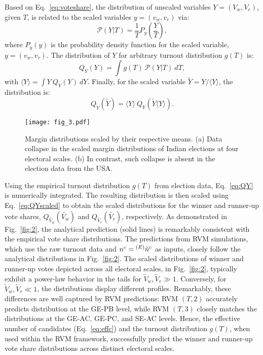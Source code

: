 Based on Eq.~\ref{eq:voteshare}, the distribution of unscaled variables $Y = (V_w, V_r)$, given $T$, is related to the scaled variables $y = (v_w, v_r)$ via:
\begin{equation}
    \mathcal{P}(Y|T) = \frac{1}{T}P_y\left(\frac{Y}{T}\right),
    \label{eq:PYT}
\end{equation}
where $P_y(y)$ is the probability density function for the scaled variable, $y = (v_w, v_r)$. The distribution of $Y$ for arbitrary turnout distribution $g(T)$ is:
\begin{equation}
    Q_Y(Y) = \int g(T)~\mathcal{P}(Y|T)~dT, 
    \label{eq:QY}
\end{equation}
with $\langle Y \rangle = \int Y ~  Q_Y(Y)~dY$.
Finally, for the scaled variable $\widetilde{Y} = Y / \langle Y \rangle$, the distribution is:
\begin{equation}
    Q_{\widetilde{Y}}(\widetilde{Y}) =  \langle Y \rangle ~ Q_Y(\widetilde{Y}  \langle Y \rangle). 
    \label{eq:QYscaled}
\end{equation}
\begin{figure}[h!]
    \centering
    \texttt{[image: fig\_3.pdf]}
    \caption{Margin distributions scaled by their respective means. (a) Data collapse in the scaled margin distributions of Indian elections at four electoral scales. (b) In contrast, such collapse is absent in the election data from the USA.}
    \label{fig:3}
\end{figure}
Using the empirical turnout distribution $g(T)$ from election data, Eq.~\ref{eq:QY} is numerically integrated. The resulting distribution is then scaled using Eq.~\ref{eq:QYscaled} to obtain the scaled distributions for the winner and runner-up vote shares, $ Q_{\widetilde{V_w}}(\widetilde{V_w})$ and $Q_{\widetilde{V_r}}(\widetilde{V_r})$, respectively. As demonstrated in Fig.~\ref{fig:2}, the analytical prediction (solid lines) is remarkably consistent with the empirical vote share distributions. The predictions from RVM simulations, which use the raw turnout data and $n^c = {^{(E)}\Tilde{n}^c}$ as inputs, closely follow the analytical distributions in Fig.~\ref{fig:2}. The scaled distributions of winner and runner-up votes depicted across all electoral scales, in Fig.~\ref{fig:2}, typically exhibit a power-law behavior in the tails for $\widetilde{V}_w, \widetilde{V}_r \gg 1$. Conversely, for $\widetilde{V}_w, \widetilde{V}_r \ll 1$, the distributions display different profiles. Remarkably, these differences are well captured by RVM predictions: RVM $(T, 2)$ accurately predicts distribution at the GE-PB level, while RVM $(T, 3)$ closely matches the distributions at the GE-AC, GE-PC, and SE-AC levels. Hence, the effective number of candidates (Eq.~\ref{eq:effc}) and the turnout distribution $g(T)$, when used within the RVM framework, successfully predict the winner and runner-up vote share distributions across distinct electoral scales.

